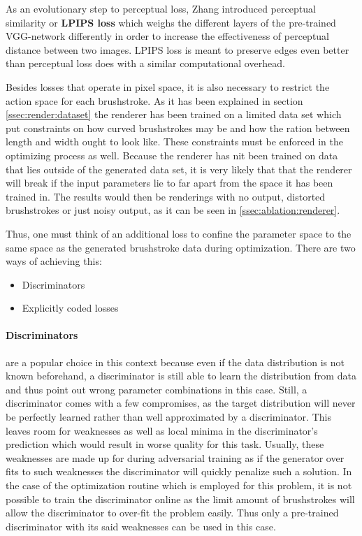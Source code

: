 As an evolutionary step to perceptual loss, Zhang \etal \cite{lpips} introduced  perceptual similarity or \textbf{LPIPS loss} which weighs the different layers of the pre-trained VGG-network differently in order to increase the effectiveness of perceptual distance between two images.
LPIPS loss is meant to preserve edges even better than perceptual loss does with a similar computational overhead.

Besides losses that operate in pixel space, it is also necessary to restrict the action space for each brushstroke.
As it has been explained in section \ref{ssec:render:dataset} the renderer has been trained on a limited data set which put constraints on how curved brushstrokes may be and how the ration between length and width ought to look like.
These constraints must be enforced in the optimizing process as well.
Because the renderer has nit been trained on data that lies outside of the generated data set, it is very likely that that the renderer will break if the input parameters lie to far apart from the space it has been trained in.
The results would then be renderings with no output, distorted brushstrokes or just noisy output, as it can be seen in \ref{ssec:ablation:renderer}.

Thus, one must think of an additional loss to confine the parameter space to the same space as the generated brushstroke data during optimization.
There are two ways of achieving this:
\begin{itemize}
    \item Discriminators
    \item Explicitly coded losses
\end{itemize}

\paragraph{Discriminators} are a popular choice in this context because even if the data distribution is not known beforehand, a discriminator is still able to learn the distribution from data and thus point out wrong parameter combinations in this case.
Still, a discriminator comes with a few compromises, as the target distribution will never be perfectly learned rather than well approximated by a discriminator.
This leaves room for weaknesses as well as local minima in the discriminator's prediction which would result in worse quality for this task.
Usually, these weaknesses are made up for during adversarial training as if the generator over fits to such weaknesses the discriminator will quickly penalize such a solution.
In the case of the optimization routine which is employed for this problem, it is not possible to train the discriminator online as the limit amount of brushstrokes will allow the discriminator to over-fit the problem easily.
Thus only a pre-trained discriminator with its said weaknesses can be used in this case.

